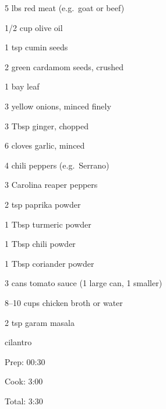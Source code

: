 \documentclass[oneside]{book}  %
\newcommand{\itemNL}{\item[] \hspace{-\labelsep}}  %
\begin{document}
\begin{IT}
  \begin{ingredients}
    \item[5 lbs] red meat (e.g.\ goat or beef)
    \item[1/2 cup] olive oil
    \item[1 tsp] cumin seeds
    \item[2] green cardamom seeds, crushed
    \item[1] bay leaf
    \item[3] yellow onions, minced finely
    \item[3 Tbsp] ginger, chopped
    \item[6] cloves garlic, minced
    \item[4] chili peppers (e.g.\ Serrano)
    \item[3] Carolina reaper peppers
    \item[2 tsp] paprika powder
    \item[1 Tbsp] turmeric powder
    \item[1 Tbsp] chili powder
    \item[1 Tbsp] coriander powder
    \item[3 cans] tomato sauce (1 large can, 1 smaller)
    \item[8--10 cups] chicken broth or water
    \item[2 tsp] garam masala
    \itemNL cilantro
  \end{ingredients}

  \switchcolumn

  \begin{timeline}
    \item[Prep:]  00:30
    \item[Cook:]  3:00
    \item[Total:] 3:30
  \end{timeline}
\end{IT}
\end{document}
